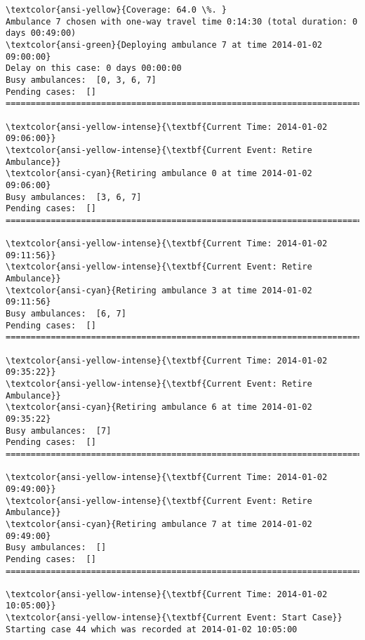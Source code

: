 \documentclass[11pt]{article}
\begin{document}
    \begin{Verbatim}[commandchars=\\\{\}]
\textcolor{ansi-yellow}{Coverage: 64.0 \%. }
Ambulance 7 chosen with one-way travel time 0:14:30 (total duration: 0 days 00:49:00)
\textcolor{ansi-green}{Deploying ambulance 7 at time 2014-01-02 09:00:00}
Delay on this case: 0 days 00:00:00
Busy ambulances:  [0, 3, 6, 7]
Pending cases:  []
========================================================================

\textcolor{ansi-yellow-intense}{\textbf{Current Time: 2014-01-02 09:06:00}}
\textcolor{ansi-yellow-intense}{\textbf{Current Event: Retire Ambulance}}
\textcolor{ansi-cyan}{Retiring ambulance 0 at time 2014-01-02 09:06:00}
Busy ambulances:  [3, 6, 7]
Pending cases:  []
========================================================================

\textcolor{ansi-yellow-intense}{\textbf{Current Time: 2014-01-02 09:11:56}}
\textcolor{ansi-yellow-intense}{\textbf{Current Event: Retire Ambulance}}
\textcolor{ansi-cyan}{Retiring ambulance 3 at time 2014-01-02 09:11:56}
Busy ambulances:  [6, 7]
Pending cases:  []
========================================================================

\textcolor{ansi-yellow-intense}{\textbf{Current Time: 2014-01-02 09:35:22}}
\textcolor{ansi-yellow-intense}{\textbf{Current Event: Retire Ambulance}}
\textcolor{ansi-cyan}{Retiring ambulance 6 at time 2014-01-02 09:35:22}
Busy ambulances:  [7]
Pending cases:  []
========================================================================

\textcolor{ansi-yellow-intense}{\textbf{Current Time: 2014-01-02 09:49:00}}
\textcolor{ansi-yellow-intense}{\textbf{Current Event: Retire Ambulance}}
\textcolor{ansi-cyan}{Retiring ambulance 7 at time 2014-01-02 09:49:00}
Busy ambulances:  []
Pending cases:  []
========================================================================

\textcolor{ansi-yellow-intense}{\textbf{Current Time: 2014-01-02 10:05:00}}
\textcolor{ansi-yellow-intense}{\textbf{Current Event: Start Case}}
Starting case 44 which was recorded at 2014-01-02 10:05:00

    \end{Verbatim}

    \begin{center}
    \end{center}
    { \hspace*{\fill} \\}
    
\end{document}
